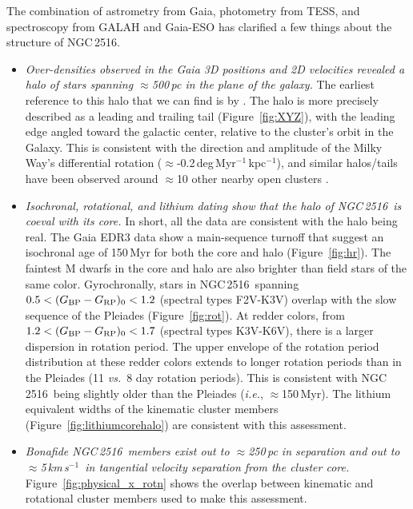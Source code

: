\documentclass[12pt,twocolumn,tighten]{aastex63}
\newcommand{\cn}{NGC\,2516} %
\newcommand{\kms}{\,km\,s$^{-1}$}
\newcommand{\bpmrpo}{(G_{\rm BP}-G_{\rm RP})_0}
\begin{document}
The combination of astrometry from Gaia, photometry from TESS, and
spectroscopy from GALAH and Gaia-ESO has clarified a few things about
the structure of \cn.
\begin{itemize}
  \item {\it Over-densities observed in the Gaia 3D positions and 2D
    velocities revealed a halo of stars spanning $\approx$500\,pc
    in the plane of the galaxy.} The earliest reference to this halo
    that we can find is by \citet{kounkel_untangling_2019}.  The halo
    is more precisely described as a leading and trailing tail
    (Figure~\ref{fig:XYZ}), with the leading edge angled toward the
    galactic center, relative to the cluster's orbit in the Galaxy.
    This is consistent with the direction and amplitude of the Milky
    Way's differential rotation
    ($\approx$-0.2\,deg\,Myr$^{-1}$\,kpc$^{-1}$), and similar
    halos/tails have been observed around $\approx$10 other nearby
    open clusters \citep{meingast_2021}.
  \item {\it Isochronal, rotational, and lithium dating show that the
    halo of \cn\ is coeval with its core.} In short, all the data are
    consistent with the halo being real.  The Gaia EDR3 data
    show a main-sequence turnoff that suggest an isochronal
    age of 150\,Myr for both the core and halo (Figure~\ref{fig:hr}).
    The faintest M dwarfs in the core and halo are also brighter than
    field stars of the same color.  Gyrochronally, stars in
    \cn\ spanning $0.5<\bpmrpo<1.2$ (spectral types F2V-K3V) overlap
    with the slow sequence of the Pleiades (Figure~\ref{fig:rot}).  At
    redder colors, from $1.2<\bpmrpo<1.7$ (spectral types K3V-K6V), there is a larger
    dispersion in rotation period.  The upper envelope of the rotation
    period distribution at these redder colors extends to longer
    rotation periods than in the Pleiades (11 {\it vs.}\ 8 day
    rotation periods).  This is consistent with \cn\ being slightly
    older than the Pleiades ({\it i.e.}, $\approx$150\,Myr).  The
    lithium equivalent widths of the kinematic cluster members
    (Figure~\ref{fig:lithiumcorehalo}) are consistent with this
    assessment.
  \item {\it Bonafide \cn\ members exist out to $\approx$250\,pc in
    separation and out to $\approx$5\kms\ in tangential velocity
    separation from the cluster core.}
    Figure~\ref{fig:physical_x_rotn} shows the overlap between
    kinematic and rotational cluster members used to make this
    assessment.
\end{itemize}
\end{document}
